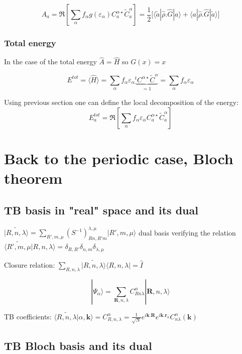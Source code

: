\documentclass{article}
\newcommand{\bra}[1]{\langle #1|}
\newcommand{\ket}[1]{|#1\rangle}
\newcommand{\op}[1]{\hat{#1}}
\begin{document}
\[ {A}_{a} =\Re \left[ 
\sum_{\alpha} f_{\alpha}g(\varepsilon_{\alpha}) 
C_{a}^{\alpha \star}\widetilde{C}_{a}^{\alpha} \right]= 
\frac{1}{2} \Big[ \bra{\tilde{a}} \op{\rho}.\op{G} \ket{a} + \bra{a} \op{\rho}.\op{G} \ket{\tilde{a}}  \Big]
 \]

\subsubsection{Total energy}

\noindent
In the case of the total energy $\op{A}=\op{H} $ so $G(x)=x$

\[E^{tot}=\langle \op{H} \rangle=\sum_{\alpha } f_{\alpha}\varepsilon_{\alpha}
\underbrace{^tC^{\alpha \star}\widetilde{C}^{\alpha}}_{=1}= \sum_{\alpha } f_{\alpha}\varepsilon_{\alpha}\]

\noindent
Using previous section one can define the local decomposition of the energy:
\[ E^{tot}_{a} =\Re \left[ 
\sum_{\alpha} f_{\alpha}\varepsilon_{\alpha}
C_{a}^{\alpha \star}\widetilde{C}_{a}^{\alpha} \right]
 \]
    
\section{Back to the periodic case, Bloch theorem}

\subsection{TB basis in "real" space and its dual}

\noindent
$\displaystyle \widetilde{\ket{R,n,\lambda}} =\sum_{R',m,\mu} 
(S^{-1})_{Rn,R'm}^{\lambda, \mu} \ket{R',m,\mu}$ dual basis
verifying the relation $ 
\widetilde{\bra{R',m,\mu}}R,n,\lambda\rangle=\delta_{R,R'}\delta_{n,m}\delta_{\lambda,\mu}$ 


\noindent
Closure relation: $\displaystyle \sum_{R,n,\lambda} 
\widetilde{\ket{R,n,\lambda}}\bra{R,n,\lambda}=\op{I}$

\[\displaystyle \ket{\Psi_{\alpha}}=\sum_{\mathbf{R},n,\lambda} C_{R n  \lambda}^{\alpha} \ket{\mathbf{R},n,\lambda }\]

\noindent
TB coefficients: $\langle \widetilde{R,n,\lambda}|\alpha, 
\mathbf{k} \rangle= C_{R,n,\lambda}^{\alpha}=\frac{1}{\sqrt{N}}e^{i  \mathbf{k}.\mathbf{R}}e^{i \mathbf{k}.\mathbf{r}_n} C_{n \lambda}^{\alpha}(\mathbf{k})$


\subsection{TB Bloch basis and its dual}
\end{document}
